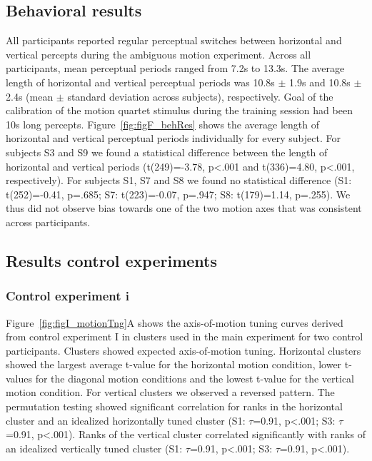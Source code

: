 \subsection{Behavioral results}
All participants reported regular perceptual switches between horizontal and vertical percepts during the ambiguous motion experiment. Across all participants, mean perceptual periods ranged from 7.2s to 13.3s. The average length of horizontal and vertical perceptual periods was 10.8s $\pm$ 1.9s and 10.8s $\pm$ 2.4s (mean $\pm$ standard deviation across subjects), respectively. Goal of the calibration of the motion quartet stimulus during the training session had been 10s long percepts. Figure~\ref{fig:figF_behRes} shows the average length of horizontal and vertical perceptual periods individually for every subject. For subjects S3 and S9 we found a statistical difference between the length of horizontal and vertical periods (t(249)=-3.78, p\textless.001 and t(336)=4.80, p\textless.001, respectively). For subjects S1, S7 and S8 we found no statistical difference (S1: t(252)=-0.41, p=.685; S7: t(223)=-0.07, p=.947; S8: t(179)=1.14, p=.255). We thus did not observe bias towards one of the two motion axes that was consistent across participants.

\subsection{Results control experiments}
\label{sec:rescontrol}
\subsubsection{Control experiment i}
Figure~\ref{fig:figI_motionTng}A shows the axis-of-motion tuning curves derived from control experiment I in clusters used in the main experiment for two control participants. Clusters showed expected axis-of-motion tuning. Horizontal clusters showed the largest average t-value for the horizontal motion condition, lower t-values for the diagonal motion conditions and the lowest t-value for the vertical motion condition. For vertical clusters we observed a reversed pattern. The permutation testing showed significant correlation for ranks in the horizontal cluster and an idealized horizontally tuned cluster (S1: $\tau$=0.91, p\textless.001; S3: $\tau$=0.91, p\textless.001). Ranks of the vertical cluster correlated significantly with ranks of an idealized vertically tuned cluster (S1: $\tau$=0.91, p\textless.001; S3: $\tau$=0.91, p\textless.001).

